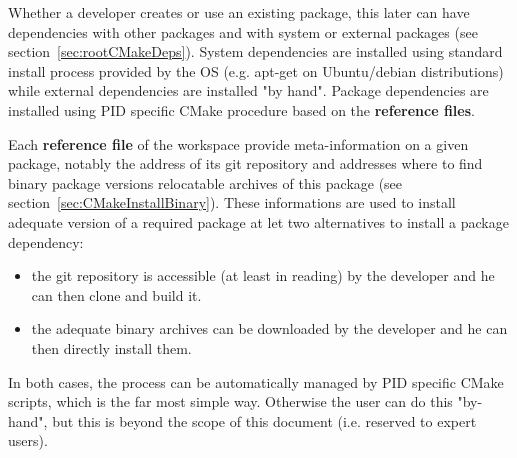\documentclass[12pt,a4paper]{article}
\begin{document}
Whether a developer creates or use an existing package, this later can have dependencies with other packages and with system or external packages (see section~\ref{sec:rootCMakeDeps}). System dependencies are installed using standard install process provided by the OS (e.g. apt-get on Ubuntu/debian distributions) while external dependencies are installed "by hand". Package dependencies are installed using PID specific CMake procedure based on the \textbf{reference files}.

Each \textbf{reference file} of the workspace provide meta-information on a given package, notably the address of its git repository and addresses where to find binary package versions relocatable archives of this package (see section~\ref{sec:CMakeInstallBinary}). These informations are used to install adequate version of a required package at let two alternatives to install a package dependency:
\begin{itemize}
\item the git repository is accessible (at least in reading) by the developer and he can then clone and build it.
\item the adequate binary archives can be downloaded  by the developer and he can then directly install them.
\end{itemize}
In both cases, the process can be automatically managed by PID specific CMake scripts, which is the far most simple way. Otherwise the user can do this "by-hand", but this is beyond the scope of this document (i.e. reserved to expert users).
\end{document}
